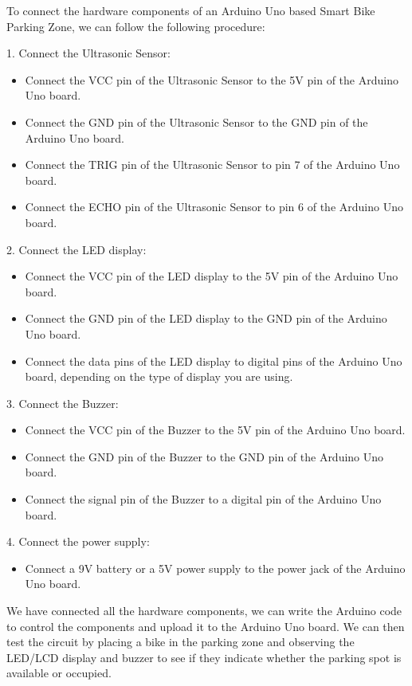 \documentclass[conference]{IEEEtran}
\begin{document}
	To connect the hardware components of an Arduino Uno based Smart Bike Parking Zone, we can follow the following procedure:
	
		1. Connect the Ultrasonic Sensor:
	\begin{itemize}
	
		\item Connect the VCC pin of the Ultrasonic Sensor to the 5V pin of the Arduino Uno board.
		\item Connect the GND pin of the Ultrasonic Sensor to the GND pin of the Arduino Uno board.
		\item Connect the TRIG pin of the Ultrasonic Sensor to pin 7 of the Arduino Uno board.
		\item Connect the ECHO pin of the Ultrasonic Sensor to pin 6 of the Arduino Uno board.
	\end{itemize}
		2. Connect the LED display:
\begin{itemize}
	
	\item Connect the VCC pin of the LED display to the 5V pin of the Arduino Uno board.
	\item Connect the GND pin of the LED display to the GND pin of the Arduino Uno board.
	\item Connect the data pins of the LED display to digital pins of the Arduino Uno board, depending on the type of display you are using.

\end{itemize}
	3. Connect the Buzzer:
\begin{itemize}
	
	\item Connect the VCC pin of the Buzzer to the 5V pin of the Arduino Uno board.
	\item Connect the GND pin of the Buzzer to the GND pin of the Arduino Uno board.
	\item Connect the signal pin of the Buzzer to a digital pin of the Arduino Uno board.	
\end{itemize}
	4. Connect the power supply:
\begin{itemize}	
	\item Connect a 9V battery or a 5V power supply to the power jack of the Arduino Uno board.	
\end{itemize}
We have connected all the hardware components, we can write the Arduino code to control the components and upload it to the Arduino Uno board. We can then test the circuit by placing a bike in the parking zone and observing the LED/LCD display and buzzer to see if they indicate whether the parking spot is available or occupied.	
\end{document}
